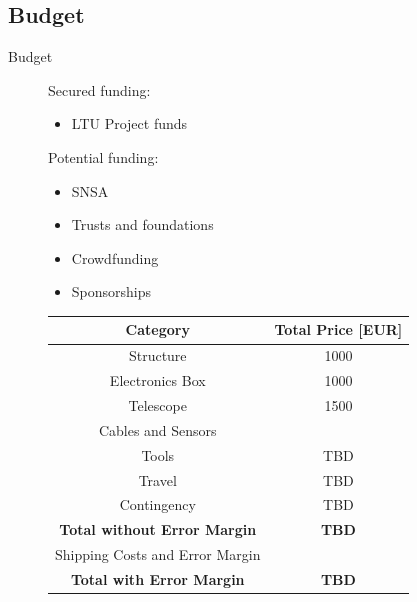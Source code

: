 \documentclass[11pt, aspectratio=169]{beamer}
\begin{document}

\subsection{Budget} 			%
\begin{frame}{Budget}
\begin{figure}[!htb]
	\centering
    \begin{minipage}{0.3\textwidth}
	Secured funding:
	\begin{itemize}
		\item LTU Project funds
	\end{itemize}
	Potential funding:
	\begin{itemize}
		\item SNSA
		\item Trusts and foundations
		\item Crowdfunding
		\item Sponsorships
	\end{itemize}
	\end{minipage}%
	\begin{minipage}{0.7\textwidth}
	\centering
	\begin{table}[h]
		\begin{tabular}{|c|c|}
		\hline
		\textbf{Category} & \textbf{Total Price [EUR]} \\ 	\hline
		Structure & 1000 \\ \hline
		Electronics Box & 1000 \\ \hline
		Telescope & 1500 \\ \hline
		Cables and Sensors  &  \\ \hline
		Tools & TBD \\ \hline
		Travel & TBD \\ \hline
		Contingency & TBD  \\ \hline
		{\textbf{Total without Error Margin}} & \textbf{TBD} \\ \hline
		Shipping Costs and Error Margin  &  \\ \hline
		{\textbf{Total with Error Margin}} & \textbf{TBD} \\ \hline
		\end{tabular}
	\end{table}
	
	\end{minipage}
\end{figure}
\end{frame}
\end{document}
